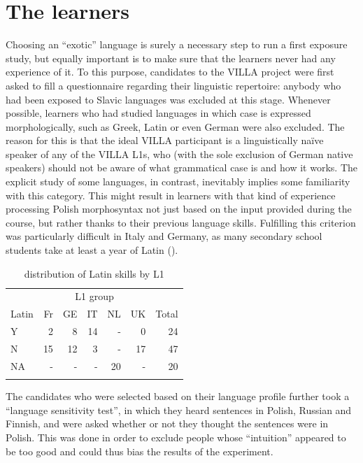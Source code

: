 \section{The learners}\label{sec:02:3}

Choosing an “exotic” language is surely a necessary step to run a first exposure study, but equally important is to make sure that the learners never had any experience of it. To this purpose, candidates to the VILLA project were first asked to fill a questionnaire regarding their linguistic repertoire: anybody who had been exposed to Slavic languages was excluded at this stage. Whenever possible, learners who had studied languages in which case is expressed morphologically, such as Greek, Latin or even German were also excluded. The reason for this is that the ideal VILLA participant is a linguistically naïve speaker of any of the VILLA L1s, who (with the sole exclusion of German native speakers) should not be aware of what grammatical case is and how it works. The explicit study of some languages, in contrast, inevitably implies some familiarity with this category. This might result in learners with that kind of experience processing Polish morphosyntax not just based on the input provided during the course, but rather thanks to their previous language skills. Fulfilling this criterion was particularly difficult in Italy and Germany, as many secondary school students take at least a year of Latin (). 

\begin{table}
    \begin{tabularx}{\textwidth}{Xrrrrrr}
    \lsptoprule
         & \multicolumn{5}{c}{L1 group} & \\
        Latin & Fr & GE & IT & NL & UK & Total\\
    \midrule
        Y & 2 & 8 & 14 & {}- & 0 & 24\\
        N & 15 & 12 & 3 & {}- & 17 & 47\\
        NA & {}- & {}- & {}- & 20 & {}- & 20\\
    \lspbottomrule
    \end{tabularx}
    \caption{distribution of Latin skills by L1}
    \label{tab:02:7}
\end{table}

The candidates who were selected based on their language profile further took a “language sensitivity test”, in which they heard sentences in Polish, Russian and Finnish, and were asked whether or not they thought the sentences were in Polish. This was done in order to exclude people whose “intuition” appeared to be too good and could thus bias the results of the experiment.


